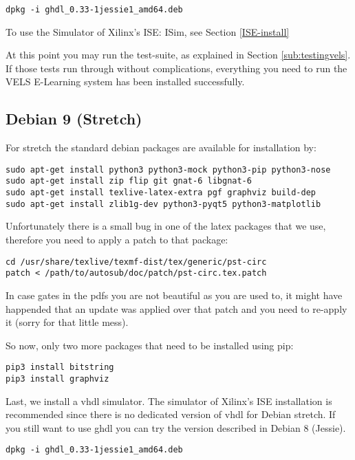 \begin{verbatim}
dpkg -i ghdl_0.33-1jessie1_amd64.deb
\end{verbatim}

To use the Simulator of Xilinx's ISE: ISim, see Section \ref{ISE-install}

At this point you may run the test-suite, as explained in Section \ref{sub:testingvels}.
If those tests run through without complications, everything you need to run the VELS
E-Learning system has been installed successfully.

\subsection{Debian 9 (Stretch)}

For stretch the standard debian packages are available for installation by:

\begin{verbatim}
sudo apt-get install python3 python3-mock python3-pip python3-nose
sudo apt-get install zip flip git gnat-6 libgnat-6
sudo apt-get install texlive-latex-extra pgf graphviz build-dep
sudo apt-get install zlib1g-dev python3-pyqt5 python3-matplotlib 
\end{verbatim}

Unfortunately there is a small bug in one of the latex packages that we use,
therefore you need to apply a patch to that package:

\begin{verbatim}
cd /usr/share/texlive/texmf-dist/tex/generic/pst-circ
patch < /path/to/autosub/doc/patch/pst-circ.tex.patch
\end{verbatim}

In case gates in the pdfs you are not beautiful as you are used to, it might have
happended that an update was applied over that patch and you need to re-apply it (sorry for that little mess).

So now, only two more packages that need to be installed using pip:

\begin{verbatim}
pip3 install bitstring
pip3 install graphviz
\end{verbatim}

Last, we install a vhdl simulator. The simulator of Xilinx's ISE installation is recommended since there is no dedicated
version of vhdl for Debian stretch. 
If you still want to use ghdl you can try the version described in Debian 8 (Jessie).

\begin{verbatim}
dpkg -i ghdl_0.33-1jessie1_amd64.deb
\end{verbatim}

